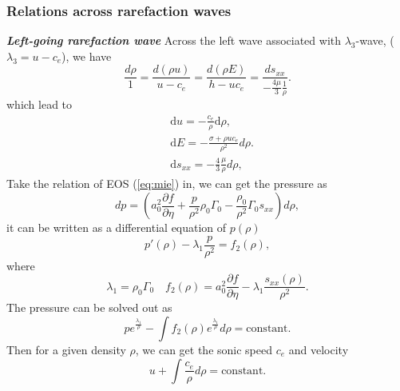 \documentclass[review]{elsarticle}
\begin{document}
\subsubsection{Relations across rarefaction waves}\label{sec:rarefaction}

\emph{\textbf{Left-going rarefaction wave} }
Across the left wave associated with $\lambda_3$-wave, ($\lambda_3=u-c_e$), we have
\begin{equation}
  \frac{d\rho}{1} = \frac{d(\rho u)}{u-c_e} = \frac{d(\rho E)}{h-uc_e} = \frac{ds_{xx}}{-\frac{4\mu}{3}\frac{1}{\rho}}.
\end{equation}
which lead to 
\begin{align}
  \label{eq:urho}
  & \text{d} u =-\frac{c_e}{\rho}\text{d}\rho,\\
 \label{eq:Erho}
  & \text{d} E = -\frac{\sigma+\rho u c_e}{\rho^2} d\rho.\\
\label{eq:sxxrho}
& \text{d} s_{xx} = -\frac{4}{3}\frac{\mu}{\rho} d\rho,
\end{align}
Take the relation of EOS (\ref{eq:mie}) in, we can get the pressure  as
\begin{equation}
  dp =  \left( a_0^2 \frac{\partial f}{\partial \eta} + \frac{p}{\rho^2}\rho_0\Gamma_0 -\frac{\rho_0}{\rho^2}\Gamma_0 s_{xx}\right) d\rho,
\end{equation}
it can be written as a differential equation of $p(\rho)$
\begin{equation}
  p'(\rho) - \lambda_1 \frac{p}{\rho^2} = f_2(\rho),
\end{equation}
where 
\begin{equation}
  \lambda_1 = \rho_0 \Gamma_0 \quad f_2(\rho) = a_0^2\frac{\partial f}{\partial \eta}- \lambda_1\frac{s_{xx}(\rho)}{\rho^2}.
\end{equation}
The pressure can be solved out as 
\begin{equation}\label{eq:p_rho}
  p e^{\frac{\lambda_1}{\rho}} - \int f_2(\rho) e^{\frac{\lambda_1}{\rho}}d\rho = \text{constant}.
\end{equation}
Then for a given density $\rho$, we can get  the sonic speed $c_e$  and velocity 
\begin{equation}
  u+\int\frac{c_e}{\rho} d\rho = \text{constant}.
\end{equation}
\end{document}
